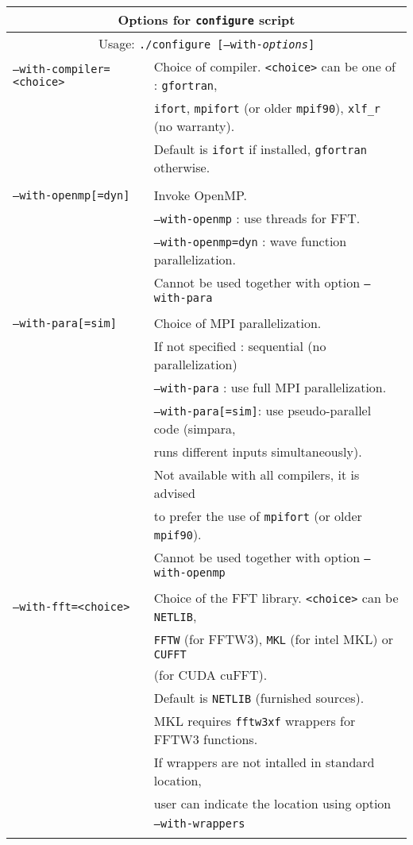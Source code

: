 \documentclass[12pt]{article}
\begin{document}
\begin{center}

\begin{tabular}{ll}
\hline
\multicolumn{2}{c}{Options for {\tt configure} script}\\
\hline
\multicolumn{2}{c}{Usage: {\tt ./configure [--with-{\it options}]} } \\
\hline

{\tt --with-compiler=<choice>} & Choice of compiler. {\tt <choice>} can be one of : {\tt gfortran},\\
  & {\tt ifort}, {\tt mpifort} (or older {\tt mpif90}), {\tt xlf\_r} (no warranty). \\
  & Default is {\tt ifort} if installed, {\tt gfortran} otherwise. \\
  \\
{\tt --with-openmp[=dyn]} & Invoke OpenMP. \\
& {\tt--with-openmp} : use threads for FFT. \\
&{\tt --with-openmp=dyn} : wave function parallelization.\\
& Cannot be used together with option {\tt --with-para}\\
\\
{\tt --with-para[=sim]} &  Choice of MPI parallelization.\\
& If not specified : sequential (no parallelization) \\
&{\tt --with-para} : use full MPI parallelization.\\
&{\tt --with-para[=sim]}: use pseudo-parallel code (simpara, \\
& runs different inputs simultaneously). \\
& Not available with all compilers, it is advised\\
& to prefer the use of {\tt mpifort} (or older {\tt mpif90}). \\
& Cannot be used together with option {\tt --with-openmp}\\ 
\\
{\tt --with-fft=<choice>} & Choice of the FFT library. {\tt<choice>} can be {\tt NETLIB}, \\
  &{\tt FFTW} (for FFTW3), {\tt MKL} (for intel MKL) or {\tt CUFFT} \\
  &(for CUDA cuFFT). \\
  & Default is {\tt NETLIB} (furnished sources).\\
  & MKL requires {\tt fftw3xf} wrappers for FFTW3 functions.\\
  & If wrappers are not intalled in standard location,\\
  & user can indicate the location using option \\
  & {\tt --with-wrappers}\\
\\


\end{tabular}
\end{center}
\end{document}
